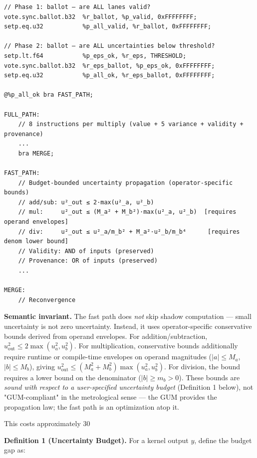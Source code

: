 \documentclass[11pt]{article}
\begin{document}
{{\begin{lstlisting}[basicstyle=\ttfamily\small]
// Phase 1: ballot — are ALL lanes valid?
vote.sync.ballot.b32  %r_ballot, %p_valid, 0xFFFFFFFF;
setp.eq.u32           %p_all_valid, %r_ballot, 0xFFFFFFFF;

// Phase 2: ballot — are ALL uncertainties below threshold?
setp.lt.f64           %p_eps_ok, %r_eps, THRESHOLD;
vote.sync.ballot.b32  %r_eps_ballot, %p_eps_ok, 0xFFFFFFFF;
setp.eq.u32           %p_all_ok, %r_eps_ballot, 0xFFFFFFFF;

@%p_all_ok bra FAST_PATH;

FULL_PATH:
    // 8 instructions per multiply (value + 5 variance + validity + provenance)
    ...
    bra MERGE;

FAST_PATH:
    // Budget-bounded uncertainty propagation (operator-specific bounds)
    // add/sub: u²_out ≤ 2·max(u²_a, u²_b)
    // mul:     u²_out ≤ (M_a² + M_b²)·max(u²_a, u²_b)  [requires operand envelopes]
    // div:     u²_out ≤ u²_a/m_b² + M_a²·u²_b/m_b⁴      [requires denom lower bound]
    // Validity: AND of inputs (preserved)
    // Provenance: OR of inputs (preserved)
    ...

MERGE:
    // Reconvergence
\end{lstlisting}

\textbf{Semantic invariant.} The fast path does \emph{not} skip shadow computation --- small uncertainty is not zero uncertainty. Instead, it uses operator-specific conservative bounds derived from operand envelopes. For addition/subtraction, $u^2_{\text{out}} \leq 2 \max(u^2_a, u^2_b)$. For multiplication, conservative bounds additionally require runtime or compile-time envelopes on operand magnitudes ($|a| \leq M_a$, $|b| \leq M_b$), giving $u^2_{\text{out}} \leq (M_a^2 + M_b^2) \max(u^2_a, u^2_b)$. For division, the bound requires a lower bound on the denominator ($|b| \geq m_b > 0$). These bounds are \emph{sound with respect to a user-specified uncertainty budget} (Definition 1 below), not "GUM-compliant" in the metrological sense --- the GUM provides the propagation law; the fast path is an optimization atop it.

This costs approximately 30%

\textbf{Definition 1 (Uncertainty Budget).} For a kernel output $y$, define the budget gap as:

}}
\end{document}

